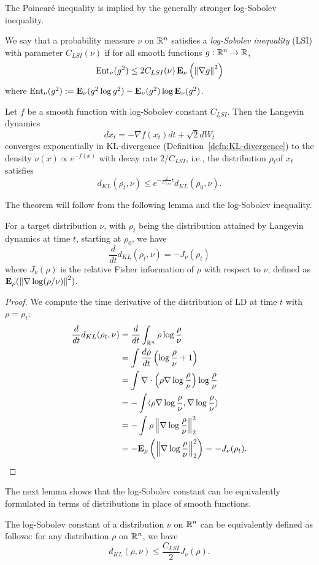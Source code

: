 The Poincar\'e inequality is implied by the generally stronger log-Sobolev
inequality.
\begin{defn}
We say that a probability measure $\nu$ on $\mathbb{R}^{n}$ satisfies a
\emph{log-Sobolev inequality} (LSI) with parameter $C_{LSI}(\nu)$
if for all smooth functions $g:\mathbb{R}^{n}\to\mathbb{R}$,
\begin{equation}
\mathrm{Ent}_{\nu}(g^{2})\leq2C_{LSI}(\nu)\,\mathbf{E}_{\nu}\left(\left\Vert \nabla g\right\Vert^{2}\right)\label{eq:lsi}
\end{equation}
where $\mathrm{Ent}_{\nu}(g^{2}):=\mathbf{E}_{\nu}(g^{2}\log g^{2})-\mathbf{E}_{\nu}(g^{2})\log\mathbf{E}_{\nu}(g^{2})$. 
\end{defn}

\begin{thm}
\label{thm:LDinKL}Let $f$ be a smooth function with log-Sobolev
constant $C_{LSI}$. Then the Langevin dynamics 
\[
dx_{t}=-\nabla f(x_{t})dt+\sqrt{2}dW_{t}
\]
converges exponentially in KL-divergence (Definition~\ref{defn:KL-divergence})
to the density $\nu(x)\propto e^{-f(x)}$ with decay rate $2/C_{LSI}$,
i.e., the distribution $\rho_{t}$of $x_{t}$satisfies 
\[
d_{KL}(\rho_{t},\nu)\le e^{-\frac{2}{C_{LSI}}t}d_{KL}(\rho_{0},\nu).
\]
\end{thm}

The theorem will follow from the following lemma and the log-Sobolev
inequality.
\begin{lem}
For a target distribution $\nu$, with $\rho_{t}$ being the distribution
attained by Langevin dynamics at time $t$, starting at $\rho_{0}$,
we have
\[
\frac{d}{dt}d_{KL}(\rho_{t},\nu)=-J_{\nu}(\rho_{t})
\]
where $J_{\nu}(\rho)$ is the relative Fisher information of $\rho$
with respect to $\nu$, defined as $\mathbf{E}_{\rho}(\left\Vert \nabla\log(\rho/\nu)\right\Vert^{2})$.
\end{lem}

\begin{proof}
We compute the time derivative of the distribution of LD at time $t$
with $\rho=\rho_{t}$:
\begin{align*}
\frac{d}{dt}d_{KL}(\rho_{t},\nu) & =\frac{d}{dt}\int_{\mathbb{R}^{n}}\rho\log\frac{\rho}{\nu}\\
 & =\int\frac{d\rho}{dt}\left(\log\frac{\rho}{\nu}+1\right)\\
 & =\int\nabla\cdot\left(\rho\nabla\log\frac{\rho}{\nu}\right)\log\frac{\rho}{\nu}\\
 & =-\int\langle\rho\nabla\log\frac{\rho}{\nu},\nabla\log\frac{\rho}{\nu}\rangle\\
 & =-\int\rho\left\Vert \nabla\log\frac{\rho}{\nu}\right\Vert^{2}_{2}\\
 & =-\mathbf{E}_{\rho}\left(\left\Vert \nabla\log\frac{\rho}{\nu}\right\Vert^{2}_{2}\right)=-J_{\nu}(\rho_{t}).
\end{align*}
\end{proof}
The next lemma shows that the log-Sobolev constant can be equivalently
formulated in terms of distributions in place of smooth functions.
\begin{lem}
The log-Sobolev constant of a distribution $\nu$ on $\mathbb{R}^{n}$ can
be equivalently defined as follows: for any distribution $\rho$ on
$\mathbb{R}^{n}$, we have
\[
d_{KL}(\rho,\nu)\le\frac{C_{LSI}}{2}J_{\nu}(\rho).
\]
\end{lem}

